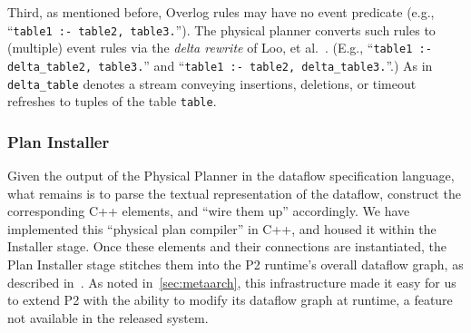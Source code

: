 \documentclass{sigmod08}
\newcommand{\ol}[1]{\texttt{\small #1}\xspace}
\begin{document}


Third, as mentioned before, Overlog rules may have no event predicate
(e.g., ``\ol{table1 :- table2, table3.}''). 
The physical planner converts such rules to (multiple) event rules via the {\em delta
rewrite} of Loo, et al.~\cite{loo-sigmod06}. (E.g., ``\ol{table1 :- delta\_table2,
table3.}'' and ``\ol{table1 :- table2,
delta\_table3.}''.) As in~\cite{loo-sigmod06} \ol{delta\_table} denotes a stream conveying
insertions, deletions, or timeout refreshes to tuples of the table
\ol{table}.


\subsubsection{Plan Installer}
\label{sec:installer}

Given the output of the Physical Planner in the dataflow specification
language, what remains is to parse the
textual representation of the dataflow,  construct the
corresponding C++ elements, and ``wire them up'' accordingly. We have
implemented this 
``physical plan compiler'' in C++, and housed it within the
Installer stage.  Once these elements and their connections are
instantiated, the Plan Installer stage stitches them into the P2
runtime's overall dataflow graph, as described in~\cite{loo-sosp05}.
As noted in~\ref{sec:metaarch}, this infrastructure made it easy for us to extend P2 with the ability to modify its dataflow graph at runtime,
a feature not available in the released system. 
% 
\end{document}
